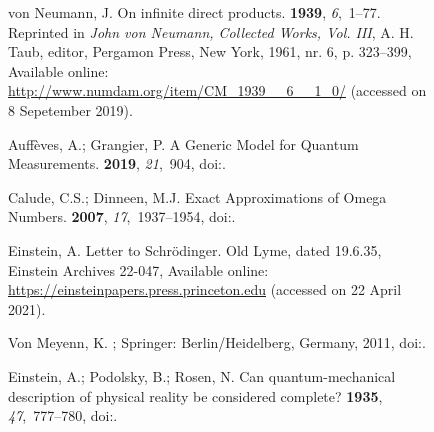 \documentclass[entropy,article,accept,oneauthor,pdftex]{Definitions/mdpi}
\begin{document}
\begin{figure}[H]
\begin{thebibliography}{999}
{von Neumann}, J.
\newblock On infinite direct products.
 {\bf 1939}, {\em 6},~1--77.
\newblock Reprinted in {\sl John {von Neumann}, Collected Works, Vol. III}, A.
  H. Taub, editor, Pergamon Press, New York, 1961, nr. 6, p. 323--399, Available online: \url{http://www.numdam.org/item/CM_1939__6__1_0/} (accessed on 8 Sepetember 2019).

Auff{\`{e}}ves, A.; Grangier, P.
\newblock A Generic Model for Quantum Measurements.
 {\bf 2019}, {\em 21},~904, doi:{\href{https://doi.org/10.3390/e21090904}{}}.

Calude, C.S.; Dinneen, M.J.
\newblock Exact Approximations of Omega Numbers.
 {\bf 2007}, {\em 17},~1937--1954, doi:{\href{https://doi.org/10.1142/S0218127407018130}{}}.

Einstein, A.%
\newblock Letter to {S}chr\"odinger.
\newblock Old Lyme, dated 19.6.35, Einstein Archives 22-047, Available online: \url{https://einsteinpapers.press.princeton.edu}  (accessed on 22 April 2021).

{Von Meyenn}, K.
; Springer: Berlin/Heidelberg, Germany, 2011, doi:{\href{https://doi.org/10.1007/978-3-642-04335-2}{}}.


Einstein, A.; Podolsky, B.; Rosen, N.
\newblock Can quantum-mechanical description of physical reality be considered
  complete?
 {\bf 1935}, {\em 47},~777--780, doi:{\href{https://doi.org/10.1103/PhysRev.47.777}{}}.


\end{thebibliography}
\end{figure}
\end{document}
